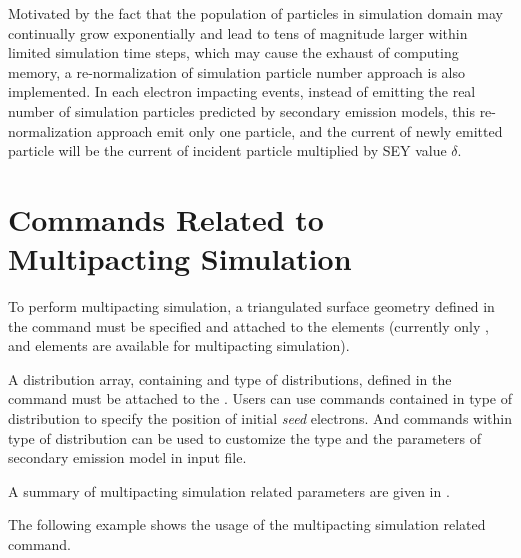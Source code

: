 Motivated by the fact that the population of particles in simulation domain may continually grow exponentially and lead to tens of magnitude larger within limited simulation time steps, which may cause the exhaust of computing memory, a re-normalization of simulation particle number approach is also implemented. In each electron impacting events, instead of emitting the real number of simulation particles predicted by secondary emission models, this re-normalization approach emit only one particle, and the current of newly emitted particle will be the current of incident particle multiplied by SEY value $\delta$.
\clearpage
\section{Commands Related to Multipacting Simulation}
\label{sec:MultipactingCmd}
To perform multipacting simulation, a triangulated surface geometry defined in the   command  must be specified and attached to the elements (currently only ,  and  elements are available for multipacting simulation).

A distribution array, containing  and  type of distributions, defined in the  command must be attached to the
. Users can use commands contained in  type of distribution to specify the position of initial \emph{seed} electrons. And commands within  type of distribution can be used to customize the type and the parameters of secondary emission model in input file.

A summary of multipacting simulation related parameters are given in .

The following example shows the usage of the multipacting simulation related command.

